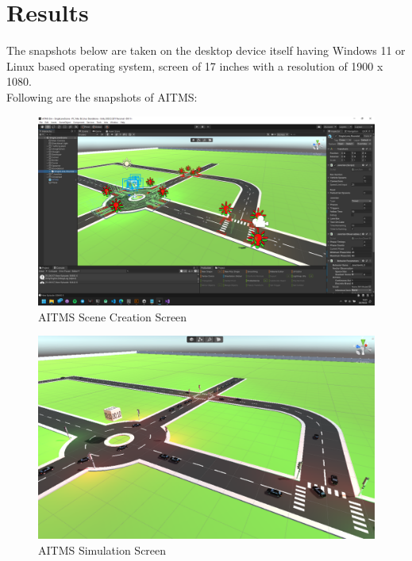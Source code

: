 \documentclass[openany,12pt]{report}
\begin{document}
		\section{Results}
		\hspace*{0.5in}The snapshots below are taken on the desktop device itself having Windows 11 or Linux based operating system, screen of 17 inches with a resolution of 1900 x 1080.\\
		
		
		
		\hspace*{0.5in}Following are the snapshots of AITMS:
		
		\begin{figure}[H]
			\centering
			\includegraphics[width=6in]{./Diagrams/PNG/scene}
			\caption{AITMS Scene Creation Screen}
		\end{figure}
		
		\begin{figure}[H]
			\centering
			\includegraphics[width=6in]{./Diagrams/PNG/cross}
			\caption{AITMS Simulation Screen}
		\end{figure}
		
\end{document}
